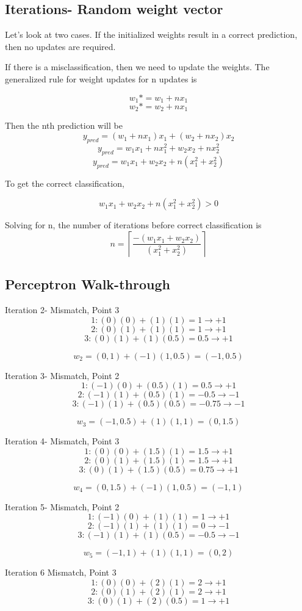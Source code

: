 \documentclass{article}
\begin{document}
\subsection{Iterations- Random weight vector}
Let's look at two cases. If the initialized weights result in a correct prediction, then no updates are required. 

If there is a misclassification, then we need to update the weights. The generalized rule for weight updates for n updates is

\[w_1* = w_1 + nx_1 \]
\[w_2* = w_2 + nx_1\]

Then the nth prediction will be
\[y_{pred} = (w_1 + nx_1)x_1 + (w_2 + nx_2)x_2\]
\[y_{pred} = w_1x_1 + nx_1^2 + w_2x_2 + nx_2^2\]
\[y_{pred} = w_1x_1 + w_2x_2 + n(x_1^2 + x_2^2)\]

To get the correct classification, 

\[w_1x_1 + w_2x_2 + n(x_1^2 + x_2^2) > 0\]

Solving for n, the number of iterations before correct classification is
\[n = \left \lceil{\frac{-(w_1x_1 + w_2x_2)}{(x_1^2 + x_2^2)}}\right \rceil \]

\subsection{Perceptron Walk-through}

Iteration 2- Mismatch, Point 3
\[1: (0)(0) + (1)(1) = 1 \rightarrow +1\]
\[2: (0)(1) + (1)(1) = 1 \rightarrow +1\]
\[3: (0)(1) + (1)(0.5) = 0.5 \rightarrow +1\]

\[w_2 = (0,1) + (-1)(1, 0.5) = (-1,0.5)\]

Iteration 3- Mismatch, Point 2
\[1: (-1)(0) + (0.5)(1) = 0.5 \rightarrow +1\]
\[2: (-1)(1) + (0.5)(1) = -0.5 \rightarrow -1\]
\[3: (-1)(1) + (0.5)(0.5) = -0.75 \rightarrow -1\]

\[w_3 = (-1,0.5) + (1)(1, 1) = (0, 1.5)\]

Iteration 4- Mismatch, Point 3
\[1: (0)(0) + (1.5)(1) = 1.5 \rightarrow +1\]
\[2: (0)(1) + (1.5)(1) = 1.5 \rightarrow +1\]
\[3: (0)(1) + (1.5)(0.5) = 0.75 \rightarrow +1\]

\[w_4 = (0, 1.5) + (-1)(1, 0.5) = (-1,1)\]

Iteration 5- Mismatch, Point 2
\[1: (-1)(0) + (1)(1) = 1 \rightarrow +1\]
\[2: (-1)(1) + (1)(1) = 0 \rightarrow -1\]
\[3: (-1)(1) + (1)(0.5) = -0.5 \rightarrow -1\]

\[w_5 = (-1,1) + (1)(1, 1) = (0,2)\]

Iteration 6 Mismatch, Point 3
\[1: (0)(0) + (2)(1) = 2 \rightarrow +1\]
\[2: (0)(1) + (2)(1) = 2 \rightarrow +1\]
\[3: (0)(1) + (2)(0.5) = 1 \rightarrow +1\]
\end{document}
